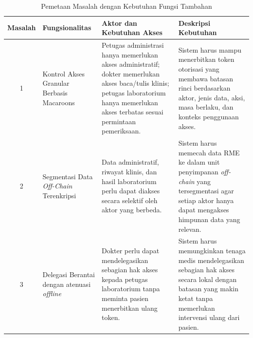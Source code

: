 \begin{table}[!ht]
	\centering
	\caption{Pemetaan Masalah dengan Kebutuhan Fungsi Tambahan}
	\label{tab:kebutuhan-fungsional-tambahan}
	\small
	\begin{tabular}{|c|p{}|p{}|p{}|}
		\hline
		\textbf{Masalah} & \textbf{Fungsionalitas}                            & \textbf{Aktor dan Kebutuhan Akses}                                                                                                                                                        & \textbf{Deskripsi Kebutuhan}                                                                                                                                         \\ \hline
		1                & Kontrol Akses Granular Berbasis Macaroons          & Petugas administrasi hanya memerlukan akses administratif; dokter memerlukan akses baca/tulis klinis; petugas laboratorium hanya memerlukan akses terbatas sesuai permintaan pemeriksaan. & Sistem harus mampu menerbitkan token otorisasi yang membawa batasan rinci berdasarkan aktor, jenis data, aksi, masa berlaku, dan konteks penggunaan akses.           \\ \hline
		2                & Segmentasi Data \textit{Off-Chain} Terenkripsi     & Data administratif, riwayat klinis, dan hasil laboratorium perlu dapat diakses secara selektif oleh aktor yang berbeda.                                                                   & Sistem harus memecah data RME ke dalam unit penyimpanan \textit{off-chain} yang tersegmentasi agar setiap aktor hanya dapat mengakses himpunan data yang relevan.    \\ \hline
		3                & Delegasi Berantai dengan atenuasi \textit{offline} & Dokter perlu dapat mendelegasikan sebagian hak akses kepada petugas laboratorium tanpa meminta pasien menerbitkan ulang token.                                                            & Sistem harus memungkinkan tenaga medis mendelegasikan sebagian hak akses secara lokal dengan batasan yang makin ketat tanpa memerlukan intervensi ulang dari pasien. \\ \hline
	\end{tabular}
\end{table}